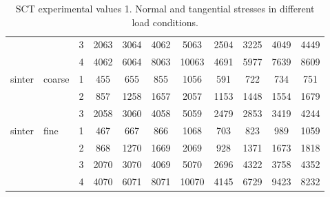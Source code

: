 \begin{table}[h]
\begin{tabular}{ll|c|cccc|cccc}
          &       & 3     & 2063  & 3064  & 4062  & 5063  & 2504  & 3225  & 4049  & 4449 \\
          &       & 4     & 4062  & 6064  & 8063  & 10063 & 4691  & 5977  & 7639  & 8609 \\
\hline
    sinter & coarse & 1     & 455   & 655   & 855   & 1056  & 591   & 722   & 734   & 751 \\
          &       & 2     & 857   & 1258  & 1657  & 2057  & 1153  & 1448  & 1554  & 1679 \\
          &       & 3     & 2058  & 3060  & 4058  & 5059  & 2479  & 2853  & 3419  & 4244 \\
\hline
    sinter & fine  & 1     & 467   & 667   & 866   & 1068  & 703   & 823   & 989   & 1059 \\
          &       & 2     & 868   & 1270  & 1669  & 2069  & 928   & 1371  & 1673  & 1818 \\
          &       & 3     & 2070  & 3070  & 4069  & 5070  & 2696  & 4322  & 3758  & 4352 \\
          &       & 4     & 4070  & 6071  & 8071  & 10070 & 4145  & 6729  & 9423  & 8232 \\
       \hline
\end{tabular}
\caption[SCT experimental values 1]{\acs{SCT} experimental values 1. Normal and
tangential stresses in different load conditions.}
\label{tab:21shearcell2}
\end{table}